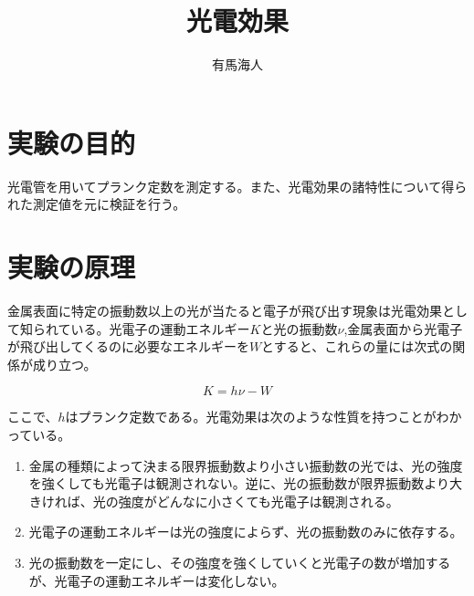 \documentclass{jsarticle}
\begin{document}
\title{光電効果}
\author{有馬海人}
\maketitle


\section{実験の目的}

光電管を用いてプランク定数を測定する。また、光電効果の諸特性について得られた測定値を元に検証を行う。

\section{実験の原理}

金属表面に特定の振動数以上の光が当たると電子が飛び出す現象は光電効果として知られている。光電子の運動エネルギー$K$と光の振動数$\nu$,金属表面から光電子が飛び出してくるのに必要なエネルギーを$W$とすると、これらの量には次式の関係が成り立つ。

\begin{equation}
    K = h\nu -W
\end{equation}

ここで、$h$はプランク定数である。光電効果は次のような性質を持つことがわかっている。

\begin{enumerate}
    \item 金属の種類によって決まる限界振動数より小さい振動数の光では、光の強度を強くしても光電子は観測されない。逆に、光の振動数が限界振動数より大きければ、光の強度がどんなに小さくても光電子は観測される。
    \item 光電子の運動エネルギーは光の強度によらず、光の振動数のみに依存する。
    \item 光の振動数を一定にし、その強度を強くしていくと光電子の数が増加するが、光電子の運動エネルギーは変化しない。
\end{enumerate}
\end{document}
